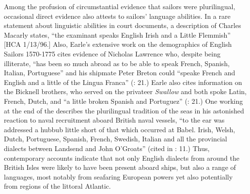 Among the profusion of circumstantial evidence that sailors were plurilingual, occasional direct evidence also attests to sailors’ language abilities. In a rare statement about linguistic abilities in court documents, a description of Charles Macarly states, “the examinant speaks English Irish and a Little Flemmish” [HCA 1/13/96.] Also, Earle’s extensive work on the demographics of English  Sailors 1570-1775 cites evidence of Nicholas Lawrence who, despite being illiterate, “has been so much abroad as to be able to speak French, Spanish, Italian, Portuguese” and his shipmate Peter Breton could “speake French and English and a little of the Lingua Franca” (\citeyear*{Earle1998}: 21.) Earle also cites information on the Bicknell brothers, who served on the privateer \textit{Swallow} and both spoke Latin, French, Dutch, and “a little broken Spanish and Portuguez” (\citeyear*{Earle1998}: 21.) One  working at the end of the  describes the plurilingual tradition of the seas in his astonished reaction to naval recruitment aboard British naval vessels, “to the ear was addressed a hubbub little short of that which occurred at Babel. Irish, Welsh, Dutch, Portuguese, Spanish, French, Swedish, Italian and all the provincial dialects between Landsend and John O’Groats” (cited in \citealt{AdkinsAdkins2008}: 11.) Thus, contemporary accounts indicate that not only English dialects from around the British Isles were likely to have been present aboard ships, but also a range of languages, most notably from seafaring European powers yet also potentially from regions of the littoral Atlantic. 


